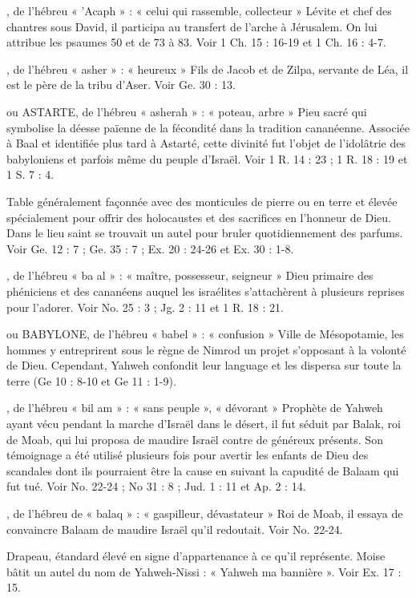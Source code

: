 \begin{multicols}{2}
, de l'hébreu « 'Acaph » : « celui qui rassemble, collecteur »
Lévite et chef des chantres sous David, il participa au transfert de l’arche à Jérusalem. On lui attribue les psaumes 50 et de 73 à 83. Voir 1 Ch. 15 : 16-19 et 1 Ch. 16 : 4-7.

, de l'hébreu « asher » : « heureux »
Fils de Jacob et de Zilpa, servante de Léa, il est le père de la tribu d’Aser. Voir Ge. 30 : 13.

ou ASTARTE, de l’hébreu « asherah » : « poteau, arbre »
Pieu sacré qui symbolise la déesse païenne de la fécondité dans la tradition cananéenne. Associée à Baal et identifiée plus tard à Astarté, cette divinité fut l’objet de l’idolâtrie des babyloniens et parfois même du peuple d’Israël. Voir 1 R. 14 : 23 ; 1 R. 18 : 19 et 1 S. 7 : 4.

Table généralement façonnée avec des monticules de pierre ou en terre et élevée spécialement pour offrir des holocaustes et des sacrifices en l'honneur de Dieu. Dans le lieu saint se trouvait un autel pour bruler quotidiennement des parfums. Voir Ge. 12 : 7 ; Ge. 35 : 7 ; Ex. 20 : 24-26 et Ex. 30 : 1-8.

, de l'hébreu « ba al » : « maître, possesseur, seigneur »
Dieu primaire des phéniciens et des cananéens auquel les israélites s’attachèrent à plusieurs reprises pour l’adorer. Voir No. 25 : 3 ; Jg. 2 : 11 et 1 R. 18 : 21.

ou BABYLONE, de l'hébreu « babel » : « confusion »
Ville de Mésopotamie, les hommes y entreprirent sous le règne de Nimrod un projet s’opposant à la volonté de Dieu. Cependant, Yahweh confondit leur language et les dispersa sur toute la terre (Ge 10 : 8-10 et Ge 11 : 1-9).

, de l'hébreu « bil am » : « sans peuple », « dévorant »
Prophète de Yahweh ayant vécu pendant la marche d’Israël dans le désert, il fut séduit par Balak, roi de Moab, qui lui proposa de maudire Israël contre de généreux présents. Son témoignage a été utilisé plusieurs fois pour avertir les enfants de Dieu des scandales dont ils pourraient être la cause en suivant la capudité de Balaam qui fut tué. Voir No. 22-24 ; No 31 : 8 ; Jud. 1 : 11 et Ap. 2 : 14.

, de l'hébreu de « balaq » : « gaspilleur, dévastateur »
Roi de Moab, il essaya de convaincre Balaam de maudire Israël qu’il redoutait. Voir No. 22-24.

Drapeau, étandard élevé en signe d'appartenance à ce qu'il représente. Moise bâtit un autel du nom de Yahweh-Nissi : « Yahweh ma bannière ». Voir Ex. 17 : 15.


\end{multicols}
